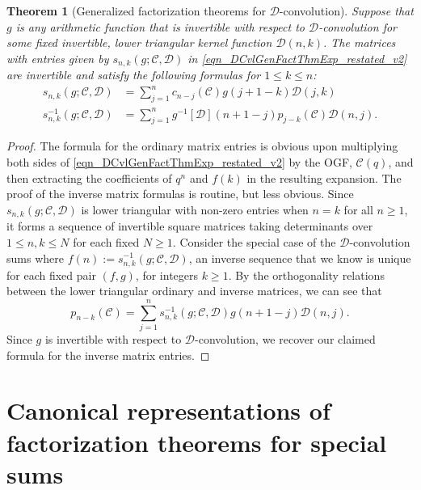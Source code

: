 \documentclass[12pt,reqno,a4letter]{article}
\numberwithin{figure}{section}
\numberwithin{table}{section}
\numberwithin{equation}{section}
\theoremstyle{plain}
\newtheorem{theorem}{Theorem}
\numberwithin{theorem}{section}
\theoremstyle{definition}
\begin{document}
\begin{theorem}[Generalized factorization theorems for $\mathcal{D}$-convolution]
Suppose that $g$ is any arithmetic function that is invertible with respect to 
$\mathcal{D}$-convolution for some fixed invertible, lower triangular kernel function 
$\mathcal{D}(n, k)$. The matrices with entries given by 
$s_{n,k}(g; \mathcal{C},\mathcal{D})$ in 
\eqref{eqn_DCvlGenFactThmExp_restated_v2} 
are invertible and satisfy the following formulas for $1 \leq k \leq n$: 
\begin{align*}
s_{n,k}(g; \mathcal{C},\mathcal{D}) & = \sum_{j=1}^{n} c_{n-j}(\mathcal{C}) g(j+1-k) \mathcal{D}(j, k) \\ 
s_{n,k}^{-1}(g; \mathcal{C},\mathcal{D}) & = \sum_{j=1}^{n} g^{-1}[\mathcal{D}](n+1-j) p_{j-k}(\mathcal{C}) 
     \mathcal{D}(n, j). 
\end{align*}
\end{theorem}
\begin{proof}
The formula for the ordinary matrix entries is obvious upon multiplying both sides of 
\eqref{eqn_DCvlGenFactThmExp_restated_v2} by the 
OGF, $\mathcal{C}(q)$, and then extracting the coefficients of $q^n$ and $f(k)$ in the 
resulting expansion. The proof of the inverse matrix formulas is routine, but less obvious. 
Since $s_{n,k}(g; \mathcal{C},\mathcal{D})$ is lower triangular with non-zero entries when $n = k$ 
for all $n \geq 1$, it forms a sequence of invertible square matrices taking determinants over 
$1 \leq n,k \leq N$ for each fixed $N \geq 1$. 
Consider the special case of the $\mathcal{D}$-convolution sums 
where $f(n) := s_{n,k}^{-1}(g; \mathcal{C},\mathcal{D})$, an inverse sequence that 
we know is unique for each fixed pair $(f, g)$, for integers $k \geq 1$. 
By the orthogonality relations between the lower triangular ordinary and inverse matrices, 
we can see that 
\[
p_{n-k}(\mathcal{C}) = \sum_{j=1}^{n} s_{n,k}^{-1}(g; \mathcal{C},\mathcal{D}) g(n+1-j) \mathcal{D}(n, j). 
\]
Since $g$ is invertible with respect to $\mathcal{D}$-convolution, we recover our claimed formula for the 
inverse matrix entries. 
\end{proof}

\newpage
\section{Canonical representations of factorization theorems for special sums}
\label{Section_CanonicalReprsOfFactThms_KernelBasedDCVL} 
\end{document}
